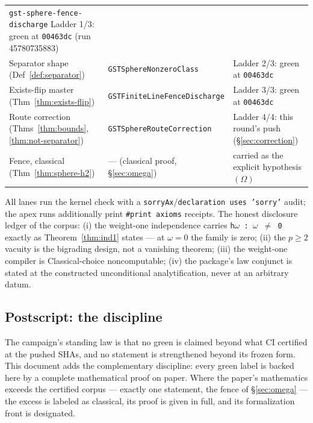 \documentclass[11pt,a4paper]{article}
\theoremstyle{plain}
\theoremstyle{definition}
\begin{document}
\begin{longtable}{@{}p{}p{}p{}@{}}
\texttt{gst-sphere-fence-discharge} Ladder 1/3: green at
\texttt{00463dc} (run 45780735883)\\
Separator shape (Def~\ref{def:separator}) &
\texttt{GSTSphereNonzeroClass} & Ladder 2/3: green at
\texttt{00463dc}\\
Exists-flip master (Thm~\ref{thm:exists-flip}) &
\texttt{GSTFiniteLineFenceDischarge} & Ladder 3/3: green at
\texttt{00463dc}\\
Route correction (Thms~\ref{thm:bounds},
\ref{thm:not-separator}) & \texttt{GSTSphereRouteCorrection} &
Ladder 4/4: this round's push (\S\ref{sec:correction})\\
Fence, classical (Thm~\ref{thm:sphere-h2}) & --- (classical
proof, \S\ref{sec:omega}) & carried as the explicit hypothesis
$(\Omega)$\\
\bottomrule
\end{longtable}

\noindent All lanes run the kernel check with a
\texttt{sorryAx}/\texttt{declaration uses 'sorry'} audit; the apex
runs additionally print \texttt{\#print axioms} receipts.  The honest
disclosure ledger of the corpus: (i) the weight-one independence
carries \texttt{h\ensuremath{\omega}~:~\ensuremath{\omega}~\ensuremath{\ne}~0} exactly as
Theorem~\ref{thm:ind1} states --- at $\omega = 0$ the family is
zero; (ii) the $p \ge 2$ vacuity is the bigrading design, not a
vanishing theorem; (iii) the weight-one compiler is Classical-choice
noncomputable; (iv) the package's law conjunct is stated at the
constructed unconditional analytification, never at an arbitrary
datum.

\subsection{Postscript: the discipline}

The campaign's standing law is that no green is claimed beyond what
CI certified at the pushed SHAs, and no statement is strengthened
beyond its frozen form.  This document adds the complementary
discipline: every green label is backed here by a complete
mathematical proof on paper.  Where the paper's mathematics exceeds
the certified corpus --- exactly one statement, the fence of
\S\ref{sec:omega} --- the excess is labeled as classical, its proof
is given in full, and its formalization front is designated.
\end{document}
